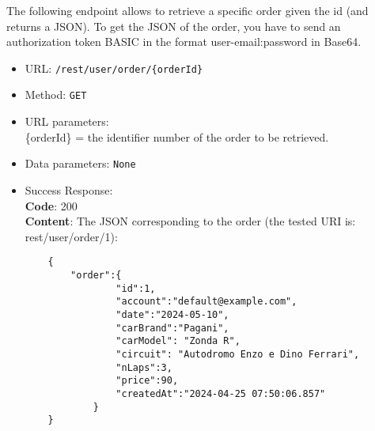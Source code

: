 The following endpoint allows to retrieve a specific order given the id (and returns a JSON). To get the JSON of the order, you have to send an authorization token BASIC in the format user-email:password in Base64.

\begin{itemize}
	\item URL: \texttt{/rest/user/order/\{orderId\}}
	\item Method: \texttt{GET}
	\item URL parameters:
		\\\{orderId\} = the identifier number of the order to be retrieved.
	\item Data parameters: \texttt{None}
	\item Success Response: \\
	\textbf{Code}: 200\\
	\textbf{Content}: The JSON corresponding to the order (the tested URI is: rest/user/order/1):
	\\\begin{verbatim}
	{
		"order":{
				"id":1,
				"account":"default@example.com",
				"date":"2024-05-10",
				"carBrand":"Pagani",
				"carModel": "Zonda R",
				"circuit": "Autodromo Enzo e Dino Ferrari",
				"nLaps":3,
				"price":90,
				"createdAt":"2024-04-25 07:50:06.857"
			}
	}
	\end{verbatim}


\end{itemize}
